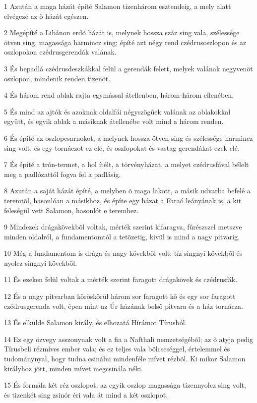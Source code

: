 \par 1 Azután a maga házát építé Salamon tizenhárom esztendeig, a mely alatt elvégezé az õ házát egészen.
\par 2 Megépíté a Libánon erdõ házát is, melynek hossza száz sing vala, szélessége ötven sing, magassága harmincz sing; építé azt négy rend czédrusoszlopon és az oszlopokon czédrusgerendák valának.
\par 3 És bepadlá czédrusdeszkákkal felül a gerendák felett, melyek valának negyvenöt oszlopon, mindenik renden tizenöt.
\par 4 És három rend ablak rajta egymással átellenben, három-három ellenében.
\par 5 És mind az ajtók és azoknak oldalfái négyszögûek valának az ablakokkal együtt, és egyik ablak a másiknak átellenébe volt mind a három renden.
\par 6 És építé az oszlopcsarnokot, a melynek hossza ötven sing és szélessége harmincz sing volt; és egy tornáczot ez elé, és oszlopokat és vastag gerendákat ezek elé.
\par 7 És építé a trón-termet, a hol ítélt, a törvényházat, a melyet czédrusfával bélelt meg a padlózattól fogva fel a padlásig.
\par 8 Azután a saját házát építé, a melyben õ maga lakott, a másik udvarba befelé a teremtõl, hasonlóan a másikhoz, és építe egy házat a Faraó leányának is, a kit feleségül vett Salamon, hasonlót e teremhez.
\par 9 Mindezek drágakövekbõl voltak, mérték szerint kifaragva, fûrészszel metszve minden oldalról, a fundamentomtól a tetõzetig, kivül is mind a nagy pitvarig.
\par 10 Még a fundamentom is drága és nagy kövekbõl volt: tíz singnyi kövekbõl és nyolcz singnyi kövekbõl.
\par 11 És ezeken felül voltak a mérték szerint faragott drágakövek és czédrusfák.
\par 12 És a nagy pitvarban köröskörül három sor faragott kõ és egy sor faragott czédrusgerenda volt, épen mint az Úr házának belsõ pitvara és a ház tornácza.
\par 13 És elkülde Salamon király, és elhozatá Hírámot Tírusból.
\par 14 Ez egy özvegy asszonynak volt a fia a Nafthali nemzetségébõl; az õ atyja pedig Tírusbeli rézmíves ember vala; és ez teljes vala bölcseséggel, értelemmel és tudománynyal, hogy tudna csinálni mindenféle mívet rézbõl. Ki mikor Salamon királyhoz jött, minden mívet megcsinála néki.
\par 15 És formála két réz oszlopot, az egyik oszlop magassága tizennyolcz sing volt, és tizenkét sing zsinór éri vala át mind a két oszlopot.
